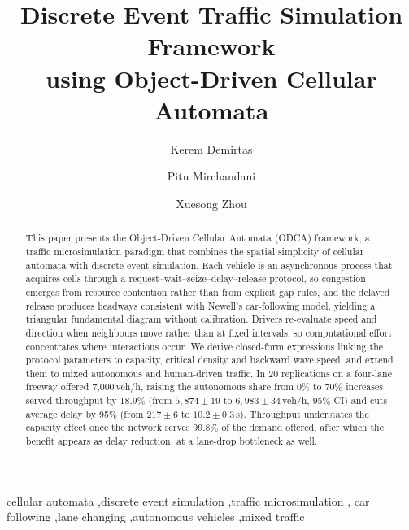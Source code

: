 \documentclass[review,authoryear]{elsarticle}
\begin{document}
\begin{frontmatter}

\title{Discrete Event Traffic Simulation Framework\\using Object-Driven Cellular Automata}

\author[asu]{Kerem Demirtas}
\author[asu]{Pitu Mirchandani}
\author[ssebe]{Xuesong Zhou}


\begin{abstract}
This paper presents the Object-Driven Cellular Automata (ODCA) framework, a traffic microsimulation paradigm that combines the spatial simplicity of cellular automata with discrete event simulation. Each vehicle is an asynchronous process that acquires cells through a request--wait--seize--delay--release protocol, so congestion emerges from resource contention rather than from explicit gap rules, and the delayed release produces headways consistent with Newell's car-following model, yielding a triangular fundamental diagram without calibration. Drivers re-evaluate speed and direction when neighbours move rather than at fixed intervals, so computational effort concentrates where interactions occur. We derive closed-form expressions linking the protocol parameters to capacity, critical density and backward wave speed, and extend them to mixed autonomous and human-driven traffic. In 20 replications on a four-lane freeway offered 7{,}000\,veh/h, raising the autonomous share from 0\% to 70\% increases served throughput by 18.9\% (from $5{,}874 \pm 19$ to $6{,}983 \pm 34$\,veh/h, 95\% CI) and cuts average delay by 95\% (from $217 \pm 6$ to $10.2 \pm 0.3$\,s). Throughput understates the capacity effect once the network serves 99.8\% of the demand offered, after which the benefit appears as delay reduction, at a lane-drop bottleneck as well.
\end{abstract}

\begin{keyword}
cellular automata \sep discrete event simulation \sep traffic microsimulation \sep
car following \sep lane changing \sep autonomous vehicles \sep mixed traffic
\end{keyword}

\end{frontmatter}
\end{document}
